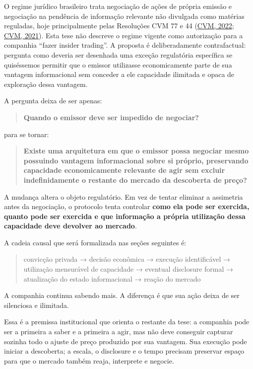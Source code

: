 \documentclass[
  a4paper,
]{article}
\begin{document}
O regime jurídico brasileiro trata negociação de ações de própria
emissão e negociação na pendência de informação relevante não divulgada
como matérias reguladas, hoje principalmente pelas Resoluções CVM 77 e
44 (\protect\hyperlink{ref-1}{CVM, 2022}; \protect\hyperlink{ref-2}{CVM,
2021}). Esta tese não descreve o regime vigente como autorização para a
companhia ``fazer insider trading''. A proposta é deliberadamente
contrafactual: pergunta como deveria ser desenhada uma exceção
regulatória específica se quiséssemos permitir que o emissor utilizasse
economicamente parte de sua vantagem informacional sem conceder a ele
capacidade ilimitada e opaca de exploração dessa vantagem.

A pergunta deixa de ser apenas:

\begin{quote}
\textbf{Quando o emissor deve ser impedido de negociar?}
\end{quote}

para se tornar:

\begin{quote}
\textbf{Existe uma arquitetura em que o emissor possa negociar mesmo
possuindo vantagem informacional sobre si próprio, preservando
capacidade economicamente relevante de agir sem excluir indefinidamente
o restante do mercado da descoberta de preço?}
\end{quote}

A mudança altera o objeto regulatório. Em vez de tentar eliminar a
assimetria antes da negociação, o protocolo tenta controlar \textbf{como
ela pode ser exercida, quanto pode ser exercida e que informação a
própria utilização dessa capacidade deve devolver ao mercado}.

A cadeia causal que será formalizada nas seções seguintes é:

\begin{quote}
convicção privada → decisão econômica → execução identificável →
utilização mensurável de capacidade → eventual disclosure formal →
atualização do estado informacional → reação do mercado
\end{quote}

A companhia continua sabendo mais. A diferença é que sua ação deixa de
ser silenciosa e ilimitada.

Essa é a premissa institucional que orienta o restante da tese: a
companhia pode ser a primeira a saber e a primeira a agir, mas não deve
conseguir capturar sozinha todo o ajuste de preço produzido por sua
vantagem. Sua execução pode iniciar a descoberta; a escala, o disclosure
e o tempo precisam preservar espaço para que o mercado também reaja,
interprete e negocie.
\end{document}
